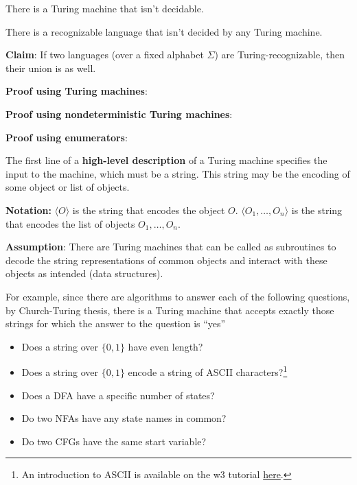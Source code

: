 \vfill

There is a Turing machine that isn't decidable.

\vfill

There is a recognizable language that isn't decided by any Turing machine.

\vfill

\newpage


{\bf Claim}: If two languages  (over a fixed alphabet  $\Sigma$) are Turing-recognizable, then  their union  is  as well.

{\bf Proof using Turing machines}:

\vfill

{\bf Proof using nondeterministic Turing machines}: 

\vfill  

{\bf  Proof using enumerators}:

\vfill

\newpage


The first line of a {\bf high-level description} of a Turing machine specifies the input to the machine, which must be a string.
This string may be the encoding of some object or  list of  objects.  

{\bf Notation:} $\langle O \rangle$ is the string that encodes the object $O$.
$\langle O_1, \ldots, O_n \rangle$ is the string that encodes the list of objects $O_1, \ldots, O_n$.

{\bf Assumption}: There are Turing  machines that can be called as subroutines
to decode the string representations of common objects and  interact with these objects as intended
(data structures).
  
For example, since there are algorithms to answer each of the following questions,
by Church-Turing thesis, there is a Turing machine that accepts exactly those strings for which the 
answer to the question is ``yes''
\begin{itemize}
    \item Does a string over $\{0,1\}$ have even length?

    \vfill

    \item Does a string over $\{0,1\}$ encode a string of ASCII characters?\footnote{An introduction to ASCII 
    is available on the w3 tutorial \href{https://www.w3schools.com/charsets/ref_html_ascii.asp}{here}.}

    \vfill

    \item Does a DFA have a specific number of states?

    \vfill

    \item Do two NFAs have any state names in common?

    \vfill

    \item Do two CFGs have the same start variable?

    \vfill

  \end{itemize}

